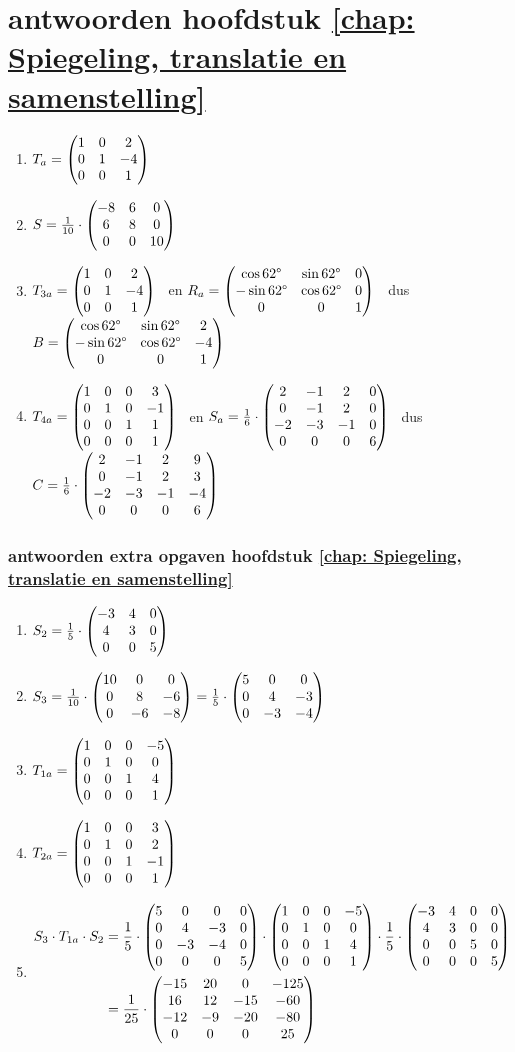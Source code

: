 \section{antwoorden  hoofdstuk \ref{chap: Spiegeling, translatie en samenstelling}}
\begin{enumerate}
	\item $ T_a = \begin{pmatrix} 1&0&2 \\ 0&1&-4 \\ 0&0&1 \end{pmatrix} $ 
	
	\item $   S = \frac{1}{10} \cdot\begin{pmatrix} -8&6&0 \\ 6&8&0 \\ 0&0&10 \end{pmatrix}  $ 
	
	\item $ T_{3a} = \begin{pmatrix} 1&0&2 \\ 0&1&-4 \\ 0&0&1 \end{pmatrix} $ 
	\ en $ R_a= \begin{pmatrix} \cos 62 \degree &\sin 62 \degree&0 \\ -\sin 62 \degree&\cos 62 \degree&0 \\ 0&0&1 \end{pmatrix} $ 
	\ dus $ B= \begin{pmatrix} \cos 62 \degree &\sin 62 \degree&2 \\ -\sin 62 \degree&\cos 62 \degree&-4 \\ 0&0&1 \end{pmatrix} $ 
	
	
	\item $ T_{4a} = \begin{pmatrix} 1&0&0&3 \\ 0&1&0&-1 \\ 0&0&1&1 \\ 0&0&0&1 \end{pmatrix} $
	\ en $ S_a= \frac{1}{6}\cdot\begin{pmatrix} 2&-1&2&0 \\ 0&-1&2&0 \\ -2&-3&-1&0 \\ 0&0&0&6 \end{pmatrix} $
	\ dus $ C = \frac{1}{6}\cdot \begin{pmatrix} 2&-1&2&9 \\ 0&-1&2&3 \\ -2&-3&-1&-4 \\ 0&0&0&6 \end{pmatrix} $
	
	
\end{enumerate}

\subsubsection{antwoorden extra opgaven hoofdstuk \ref{chap: Spiegeling, translatie en samenstelling}}
\begin{enumerate}
	\item $   S_2 = \frac{1}{5} \cdot\begin{pmatrix} -3&4&0 \\ 4&3&0 \\ 0&0&5 \end{pmatrix}  $ 
	\item $   S_3 = \frac{1}{10} \cdot\begin{pmatrix} 10&0&0 \\ 0&8&-6 \\ 0&-6&-8 \end{pmatrix}  
	= \frac{1}{5} \cdot \begin{pmatrix} 5&0&0 \\ 0&4&-3 \\ 0&-3&-4 \end{pmatrix}  $ 
	
	\item $T_{1a} = \begin{pmatrix} 1&0&0&-5 \\ 0&1&0&0 \\ 0&0&1&4 \\ 0&0&0&1 \end{pmatrix} $
    	\item $ T_{2a} = \begin{pmatrix} 1&0&0&3 \\ 0&1&0&2 \\ 0&0&1&-1 \\ 0&0&0&1 \end{pmatrix} $
    	\item 
        \begin{align*}
            S_3 \cdot T_{1a} \cdot S_2 &= \frac{1}{5} \cdot
            \begin{pmatrix} 5&0&0&0 \\ 0&4&-3&0 \\ 0&-3&-4&0 \\ 0&0&0&5 \end{pmatrix} \cdot 
        	\begin{pmatrix} 1&0&0&-5 \\ 0&1&0&0 \\ 0&0&1&4 \\ 0&0&0&1 \end{pmatrix} \cdot 
        	\frac{1}{5} \cdot \begin{pmatrix} -3&4&0&0 \\ 4&3&0&0 \\ 0&0&5&0 \\ 0&0&0&5 \end{pmatrix} \\
        	&= \frac{1}{25} \cdot \begin{pmatrix} -15&20&0&-125 \\ 16&12&-15&-60 \\ -12&-9&-20&-80 \\ 0&0&0&25 \end{pmatrix} 
    	\end{align*}
	
\end{enumerate}

